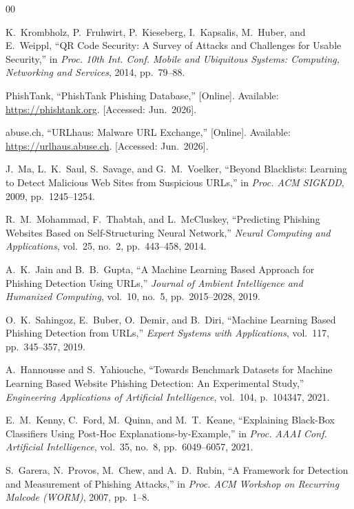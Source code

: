 \documentclass[10pt,twocolumn,letterpaper]{article}
\begin{document}
\begin{thebibliography}{00}

K.~Krombholz, P.~Fruhwirt, P.~Kieseberg, I.~Kapsalis, M.~Huber, and E.~Weippl, ``QR Code Security: A Survey of Attacks and Challenges for Usable Security,'' in \textit{Proc. 10th Int. Conf. Mobile and Ubiquitous Systems: Computing, Networking and Services}, 2014, pp.~79--88.

PhishTank, ``PhishTank Phishing Database,'' [Online]. Available: \url{https://phishtank.org}. [Accessed: Jun.~2026].

abuse.ch, ``URLhaus: Malware URL Exchange,'' [Online]. Available: \url{https://urlhaus.abuse.ch}. [Accessed: Jun.~2026].

J.~Ma, L.~K.~Saul, S.~Savage, and G.~M.~Voelker, ``Beyond Blacklists: Learning to Detect Malicious Web Sites from Suspicious URLs,'' in \textit{Proc. ACM SIGKDD}, 2009, pp.~1245--1254.

R.~M.~Mohammad, F.~Thabtah, and L.~McCluskey, ``Predicting Phishing Websites Based on Self-Structuring Neural Network,'' \textit{Neural Computing and Applications}, vol.~25, no.~2, pp.~443--458, 2014.

A.~K.~Jain and B.~B.~Gupta, ``A Machine Learning Based Approach for Phishing Detection Using URLs,'' \textit{Journal of Ambient Intelligence and Humanized Computing}, vol.~10, no.~5, pp.~2015--2028, 2019.

O.~K.~Sahingoz, E.~Buber, O.~Demir, and B.~Diri, ``Machine Learning Based Phishing Detection from URLs,'' \textit{Expert Systems with Applications}, vol.~117, pp.~345--357, 2019.

A.~Hannousse and S.~Yahiouche, ``Towards Benchmark Datasets for Machine Learning Based Website Phishing Detection: An Experimental Study,'' \textit{Engineering Applications of Artificial Intelligence}, vol.~104, p.~104347, 2021.

E.~M.~Kenny, C.~Ford, M.~Quinn, and M.~T.~Keane, ``Explaining Black-Box Classifiers Using Post-Hoc Explanations-by-Example,'' in \textit{Proc. AAAI Conf. Artificial Intelligence}, vol.~35, no.~8, pp.~6049--6057, 2021.

S.~Garera, N.~Provos, M.~Chew, and A.~D.~Rubin, ``A Framework for Detection and Measurement of Phishing Attacks,'' in \textit{Proc. ACM Workshop on Recurring Malcode (WORM)}, 2007, pp.~1--8.


\end{thebibliography}
\end{document}
